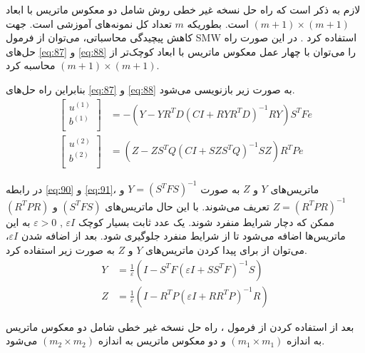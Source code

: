 لازم به ذکر است که راه حل نسخه غیر خطی روش  شامل دو معکوس ماتریس با ابعاد  $(m+1)\times (m+1)$ است. بطوریکه $m$  تعداد کل نمونه‌های آموزشی است. جهت کاهش پیچیدگی محاسباتی، می‌توان از فرمول \gls{SMW}  استفاده کرد \cite{golub2012}. در این صورت راه حل‌های \ref{eq:87} و \ref{eq:88} را می‌توان با چهار عمل معکوس ماتریس با ابعاد کوچک‌تر از $(m+1)\times (m+1)$ محاسبه کرد. 

بنابراین راه حل‌های \ref{eq:87} و \ref{eq:88} به صورت زیر بازنویسی می‌شود.
\begin{align}
\left[ \begin{matrix}
{{u}^{(1)}}  \\
{{b}^{(1)}}  \\
\end{matrix} \right]& = -(Y-Y{{R}^{T}}D{{(CI+RY{{R}^{T}}D)}^{-1}}RY){{S}^{T}}Fe \label{eq:90} \\
\left[ \begin{matrix}
{{u}^{(2)}}  \\
{{b}^{(2)}}  \\
\end{matrix} \right] & = (Z-Z{{S}^{T}}Q{{(CI+SZ{{S}^{T}}Q)}^{-1}}SZ){{R}^{T}}Pe \label{eq:91}
\end{align}

در رابطه \ref{eq:90} و \ref{eq:91}، ماتریس‌های $Y$ و $Z$  به صورت  $Y={{({{S}^{T}}FS)}^{-1}}$ و  $Z={{({{R}^{T}}PR)}^{-1}}$ تعریف می‌شوند. با این حال ماتریس‌های $({{S}^{T}}FS)$ و $({{R}^{T}}PR)$  ممکن که دچار شرایط منفرد شوند. یک عدد ثابت بسیار کوچک  $\varepsilon I$ , $\varepsilon > 0$ به این ماتریس‌ها اضافه می‌شود تا از شرایط منفرد جلوگیری شود. بعد از اضافه شدن $\varepsilon I$، می‌توان از  برای پیدا کردن ماتریس‌های $Y$ و $Z$ به صورت زیر استفاده کرد.
\begin{align}
Y&= \frac{1}{\varepsilon }(I-{{S}^{T}}F{{(\varepsilon I+S{{S}^{T}}F)}^{-1}}S) \label{eq:92} \\
Z&= \frac{1}{\varepsilon }(I-{{R}^{T}}P{{(\varepsilon I+R{{R}^{T}}P)}^{-1}}R) \label{eq:93}
\end{align}

بعد از استفاده کردن از فرمول ، راه حل نسخه غیر خطی شامل دو معکوس ماتریس به اندازه  $(m_1 \times m_1)$ و دو معکوس ماتریس به اندازه $(m_2 \times m_2)$  می‌شود.

